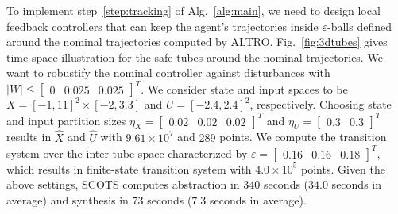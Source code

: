  To implement step~\ref{step:tracking} of Alg.~\ref{alg:main}, we need to design local feedback controllers that can keep the agent's trajectories inside $\varepsilon$-balls defined around the nominal trajectories computed by ALTRO. Fig.~\ref{fig:3dtubes} gives time-space illustration for the safe tubes around the nominal trajectories. We want to robustify the nominal controller against disturbances with $|W|\leq \begin{bmatrix}0&0.025&0.025\end{bmatrix}^T$. We consider state and input spaces to be $X=[-1,11]^2\times[-2,3.3]$ and
$U=[-2.4,2.4]^2$, respectively. Choosing state and input partition sizes $\eta_{X}=\begin{bmatrix}0.02&0.02&0.02\end{bmatrix}^T$ and
$\eta_{U}=\begin{bmatrix}0.3&0.3\end{bmatrix}^T$ results in $\hat X$ and $\hat U$ with $9.61\times 10^7$ and $289$ points. We compute the transition system over the inter-tube space characterized by $\varepsilon=\begin{bmatrix}0.16&0.16&0.18\end{bmatrix}^T$, which results in finite-state transition system with $4.0\times 10^5$ points. Given the above settings, SCOTS computes abstraction in $340$ seconds ($34.0$ seconds in average) and synthesis in $73$ seconds ($7.3$ seconds in average). %


